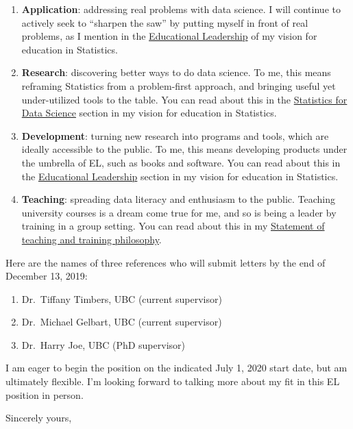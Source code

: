 \documentclass[]{article}
\providecommand{\tightlist}{%
  \setlength{\itemsep}{0pt}\setlength{\parskip}{0pt}}
\begin{document}
\begin{enumerate}
\def\labelenumi{\arabic{enumi}.}
\tightlist
\item
  \textbf{Application}: addressing real problems with data science. I will continue to actively seek to ``sharpen the saw'' by putting myself in front of real problems, as I mention in the \protect\hyperlink{educational-leadership}{Educational Leadership} of my vision for education in Statistics.
\item
  \textbf{Research}: discovering better ways to do data science. To me, this means reframing Statistics from a problem-first approach, and bringing useful yet under-utilized tools to the table. You can read about this in the \protect\hyperlink{statistics-for-data-science}{Statistics for Data Science} section in my vision for education in Statistics.
\item
  \textbf{Development}: turning new research into programs and tools, which are ideally accessible to the public. To me, this means developing products under the umbrella of EL, such as books and software. You can read about this in the \protect\hyperlink{educational-leadership}{Educational Leadership} section in my vision for education in Statistics.
\item
  \textbf{Teaching}: spreading data literacy and enthusiasm to the public. Teaching university courses is a dream come true for me, and so is being a leader by training in a group setting. You can read about this in my \protect\hyperlink{statement-of-teaching-and-training-philosophy}{Statement of teaching and training philosophy}.
\end{enumerate}

Here are the names of three references who will submit letters by the end of December 13, 2019:

\begin{enumerate}
\def\labelenumi{\arabic{enumi}.}
\tightlist
\item
  Dr.~Tiffany Timbers, UBC (current supervisor)
\item
  Dr.~Michael Gelbart, UBC (current supervisor)
\item
  Dr.~Harry Joe, UBC (PhD supervisor)
\end{enumerate}

I am eager to begin the position on the indicated July 1, 2020 start date, but am ultimately flexible. I'm looking forward to talking more about my fit in this EL position in person.

Sincerely yours,
\end{document}
